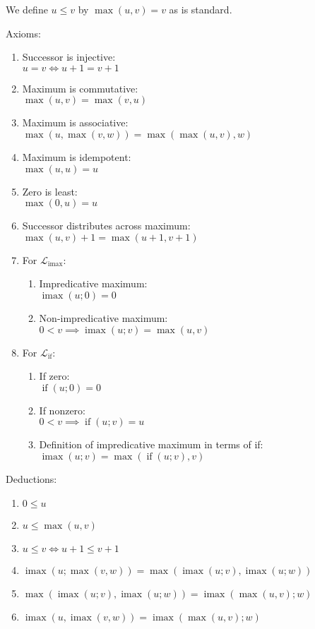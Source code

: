 \documentclass[11pt, twoside, reqno]{book}
\DeclareMathOperator{\imax}{imax}
\DeclareMathOperator{\ifop}{if}
\begin{document}
We define \(u \le v\) by \(\max(u, v) = v\) as is standard.

Axioms:
\label{alg-uni-laws}
\begin{enumerate}
\item Successor is injective:\\
  \(u = v \iff u+1 = v+1\)
\item Maximum is commutative:\\
  \(\max(u, v) = \max(v, u)\)
\item Maximum is associative:\\
  \(\max(u, \max(v, w)) = \max(\max(u, v), w)\)
\item Maximum is idempotent:\\
  \(\max(u, u) = u\)
\item Zero is least:\\
  \(\max(0, u) = u\)
\item Successor distributes across maximum:\\
  \(\max(u, v) + 1 = \max(u + 1, v + 1)\)
\item For \(\mathcal{L}_{\imax}\):
\begin{enumerate}
\item Impredicative maximum:\\
  \(\imax(u; 0) = 0\)
\item Non-impredicative maximum:\\
  \(0 < v \implies \imax(u; v) = \max(u, v)\)
\end{enumerate}
\item For \(\mathcal{L}_{\ifop}\):
\begin{enumerate}
\item If zero:\\
  \(\ifop(u; 0) = 0\)
\item If nonzero:\\
  \(0 < v \implies \ifop(u; v) = u\)
\item Definition of impredicative maximum in terms of if:\\
  \(\imax(u; v) = \max(\ifop(u; v), v)\)
\end{enumerate}
\end{enumerate}

Deductions:
\label{alg-uni-laws-more}
\begin{enumerate}
\item \(0 \le u\)
\item \(u \le \max(u, v)\)
\item \(u \le v \iff u+1 \le v+1\)
\item \(\imax(u; \max(v, w)) = \max(\imax(u; v), \imax(u; w))\)
\item \(\max(\imax(u; v), \imax(u; w)) = \imax(\max(u, v); w)\)
\item \(\imax(u, \imax(v, w)) = \imax(\max(u, v); w)\)
\end{enumerate}
\end{document}

